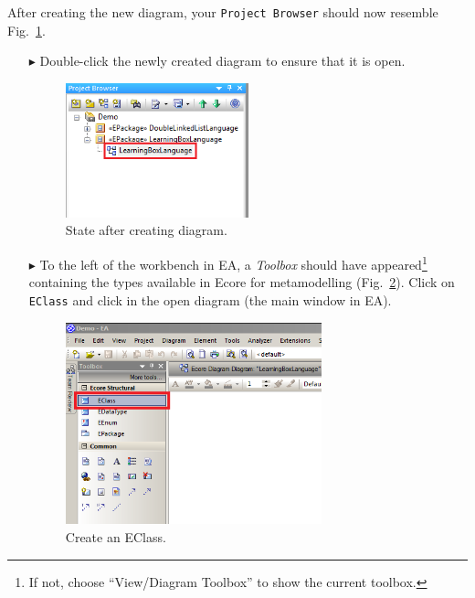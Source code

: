After creating the new diagram, your  \texttt{Project Browser} should now resemble Fig.~\ref{fig:diagram_completed}.

\begin{enumerate}
\item[$\blacktriangleright$] Double-click the newly created diagram to ensure that it is open.

\begin{figure}[htbp]
	\centering
  \includegraphics[width=0.5\textwidth]{pics/memBoxBilder/memBox06.png}
	\caption{State after creating diagram.}
	\label{fig:diagram_completed}
\end{figure}

\item[$\blacktriangleright$] To the left of the workbench in EA, a \emph{Toolbox} should have appeared\footnote{If not, choose ``View/Diagram Toolbox'' to show the current toolbox.} containing the types available in Ecore for metamodelling (Fig.~\ref{fig:eclass}).
Click on \texttt{EClass} and click in the open diagram (the main window in EA).

\begin{figure}[htbp]
	\centering
  \includegraphics[width=0.7\textwidth]{pics/memBoxBilder/memBox07.png}
	\caption{Create an EClass.}
	\label{fig:eclass}
\end{figure}



\end{enumerate}
